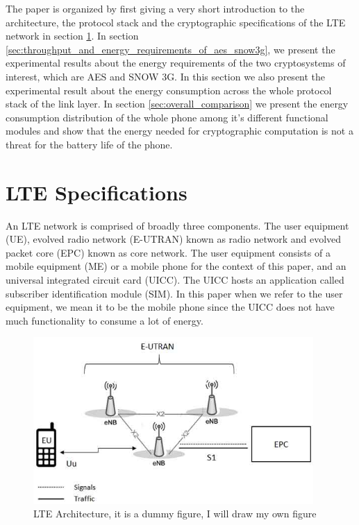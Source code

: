 \documentclass[lnicst,sechang,a4paper]{svmultln}
\begin{document}
The paper is organized by first giving a very short introduction to the architecture, the protocol stack and the cryptographic specifications of the LTE network in section \ref{sec:lte_specifications}. In section \ref{sec:throughput_and_energy_requirements_of_aes_snow3g}, we present the experimental results about the energy requirements of the two cryptosystems of interest, which are AES and SNOW 3G. In this section we also present the experimental result about the energy consumption across the whole protocol stack of the link layer. In section \ref{sec:overall_comparison} we present the energy consumption distribution of the whole phone among it's different functional modules and show that the energy needed for cryptographic computation is not a threat for the battery life of the phone. 

\section{LTE Specifications}
\label{sec:lte_specifications}
An LTE network is comprised of broadly three components. The user equipment (UE), evolved radio network (E-UTRAN) known as radio network and evolved packet core (EPC) known as core network. The user equipment consists of a mobile equipment (ME) or a mobile phone for the context of this paper, and an universal integrated circuit card (UICC). The UICC hosts an application called subscriber identification module (SIM). In this paper when we refer to the user equipment, we mean it to be the mobile phone since the UICC does not have much functionality to consume a lot of energy.

\begin{figure}
  \includegraphics[width=0.95\textwidth]{lte_architecture.jpg}
\caption{LTE Architecture, it is a dummy figure, I will draw my own figure}
\label{fig:protocl_stack}       %
\end{figure}
\end{document}
